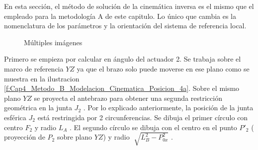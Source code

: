      En esta sección, el método de solución de la cinemática inversa es el mismo que el empleado para la metodología A de este capitulo. Lo único que cambia es la nomenclatura de los parámetros y la orientación del sistema de referencia local.
  
           \begin{figure}[htb]
             \centering
             \caption{Múltiples imágenes}
             \label{f:Cap4_Metodo_B_Modelacion_Cinematica_Posicion_4}
        \end{figure}
  
      Primero se empieza por calcular en ángulo del actuador 2. Se trabaja sobre el marco de referencia $YZ$ ya que el brazo   solo puede moverse en ese plano como se muestra en la ilustracion \ref{f:Cap4_Metodo_B_Modelacion_Cinematica_Posicion_4a}. Sobre el mismo plano $ YZ $ se proyecta el antebrazo para obtener una segunda restricción geométrica en la junta  \( J_{2} \) . Por lo explicado anteriormente, la posición de la junta esférica  \( J_{2} \)  está restringida por 2 circunferencias. Se dibuja el primer círculo con centro  \( F_{2} \)  y radio  \( L_{A} \) . El segundo círculo se dibuja con el centro en el punto  \( P'_{2} \) ( proyección de $P_{2}$ sobre plano $YZ$)  y radio  \( \sqrt[]{L_{B}^{2}-P_{0x}^{2}} \) .
      

